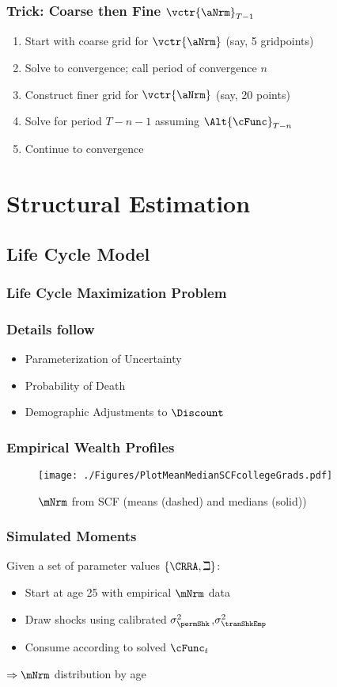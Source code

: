 \documentclass{beamer}
\begin{document}
\begin{frame}
\frametitle{Trick: Coarse then Fine $\vctr{\aNrm}_{T-1}$}

\begin{enumerate}
\item Start with coarse grid for $\vctr{\aNrm}$ (say, 5 gridpoints)
\item Solve to convergence; call period of convergence $n$
\item Construct finer grid for $\vctr{\aNrm}$ (say, 20 points)
\item Solve for period $T-n-1$ assuming $\Alt{\cFunc}_{T-n}$ 
\item Continue to convergence
\end{enumerate}

\end{frame}

\section{Structural Estimation}
\subsection{Life Cycle Model}

\begin{frame}
\frametitle{Life Cycle Maximization Problem}


\end{frame}

\begin{frame}
\frametitle{Details follow~\cite{cagettiWprofiles}}
\begin{itemize}
\item Parameterization of Uncertainty
\item Probability of Death
\item Demographic Adjustments to $\Discount$
\end{itemize}
\end{frame}

\begin{frame}
\frametitle{Empirical Wealth Profiles}
\begin{figure}
    \texttt{[image: ./Figures/PlotMeanMedianSCFcollegeGrads.pdf]}
    \caption{$\mNrm$ from SCF (means (dashed) and medians (solid))}
    \label{fig:MeanMedianSCF}
\end{figure}
\end{frame}

\begin{frame}
\frametitle{Simulated Moments}

Given a set of parameter values $\{\CRRA,\beth\}$:
\begin{itemize}
\item Start at age 25 with empirical $\mNrm$ data
\item Draw shocks using calibrated $\sigma^{2}_{\permShk}$,$\sigma^{2}_{\tranShkEmp}$
\item Consume according to solved $\cFunc_{t}$
\end{itemize}
\pause 
$\Rightarrow \mNrm$ distribution by age
\end{frame}
\end{document}
